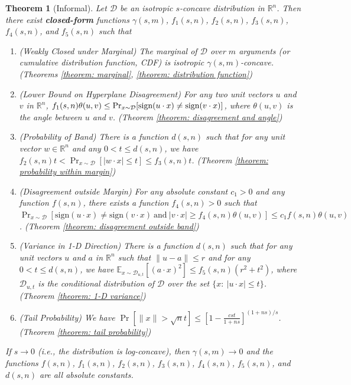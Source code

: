 \documentclass[11pt]{article}
\newcommand{\cD}{\mathcal{D}}
\newcommand{\E}{\mathbb{E}}
\newcommand{\R}{\mathbb{R}}
\newcommand{\sign}{\textup{sign}}
\newtheorem{theorem}{Theorem}
\begin{document}
\begin{theorem}[Informal]
\label{theorem: geometry of s-concavity}
Let $\cD$ be an isotropic $s$-concave distribution in $\R^n$. Then there exist \textbf{closed-form} functions $\gamma(s,m)$, $f_1(s, n)$, $f_2(s, n)$, $f_3(s, n)$, $f_4(s, n)$, and $f_5(s, n)$ such that
\begin{enumerate}[leftmargin=*]\setlength{\itemsep}{-0.1cm}
\item
\emph{(Weakly Closed under Marginal)} The marginal of $\cD$ over $m$ arguments (or cumulative distribution function, CDF) is isotropic $\gamma(s,m)$-concave. (Theorems \ref{theorem: marginal}, \ref{theorem: distribution function})
\item
\emph{(Lower Bound on Hyperplane Disagreement)} For any two unit vectors $u$ and $v$ in $\R^n$, $f_1(s, n)\theta(u,v)\le\Pr_{x\sim \cD}[\sign(u\cdot x)\not=\sign(v\cdot x)]$, where $\theta(u,v)$ is the angle between $u$ and $v$. (Theorem \ref{theorem: disagreement and angle})
\item
\emph{(Probability of Band)} There is a function $d(s, n)$ such that for any unit vector $w\in\R^n$ and any $0<t\le d(s,n)$, we have $f_2(s, n)t< \Pr_{x\sim\cD}[|w\cdot x|\le t]\le f_3(s, n)t$. (Theorem \ref{theorem: probability within margin})
\item
\emph{(Disagreement outside Margin)} For any absolute constant $c_1>0$ and any function $f(s,n)$, there exists a function $f_4(s,n)>0$ such that $\Pr_{x\sim\mathcal{D}}[\mathrm{sign}(u\cdot x)\not=\mathrm{sign}(v\cdot x)\ \text{and}\ |v\cdot x|\ge f_4(s,n)\theta(u,v)]\le c_1f(s,n)\theta(u,v)$. (Theorem \ref{theorem: disagreement outside band})
\item
\emph{(Variance in 1-D Direction)} There is a function $d(s, n)$ such that for any unit vectors $u$ and $a$ in $\R^n$ such that $\|u-a\|\le r$ and for any $0<t\le d(s, n)$, we have $\E_{x\sim \cD_{u,t}}[(a\cdot x)^2]\le f_5(s, n)(r^2+t^2)$, where $\cD_{u,t}$ is the conditional distribution of $\cD$ over the set $\{x:\ |u\cdot x|\le t\}$. (Theorem \ref{theorem: 1-D variance})
\item
\emph{(Tail Probability)}
We have
$\Pr[\|x\|>\sqrt{n}t]\le \left[1-\frac{cst}{1+ns}\right]^{(1+ns)/s}$. (Theorem \ref{theorem: tail probability})
\end{enumerate}

If $s\rightarrow 0$ (i.e., the distribution is log-concave), then $\gamma(s,m)\rightarrow 0$ and the functions $f(s,n)$, $f_1(s,n)$, $f_2(s,n)$, $f_3(s,n)$, $f_4(s,n)$, $f_5(s,n)$, and $d(s,n)$ are all absolute constants.
\end{theorem}
\end{document}
